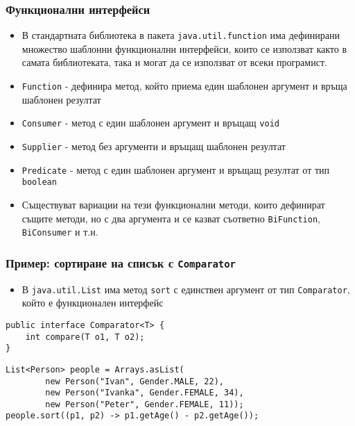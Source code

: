 \documentclass[ignorenonframetext, hyperref=unicode,compress,pdflatex]{beamer}
\begin{document}
\begin{frame}[containsverbatim]\frametitle{Функционални интерфейси}
\begin{itemize}
  \item В стандартната библиотека в пакета \lstinline{java.util.function} има
  дефинирани множество шаблонни функционални интерфейси, които се използват както в самата библиотеката, така
  и могат да се използват от всеки програмист.
  \item \lstinline{Function} - дефинира метод, който приема един шаблонен
  аргумент и връща шаблонен резултат
  \item \lstinline{Consumer} - метод с един шаблонен
  аргумент и връщащ \lstinline{void}
  \item \lstinline{Supplier} - метод без аргументи и връщащ
  шаблонен резултат
  \item \lstinline{Predicate} - метод с един шаблонен
  аргумент и връщащ резултат от тип \lstinline{boolean}
  \item Съществуват вариации на тези функционални методи, които дефинират същите
  методи, но с два аргумента и се казват съответно \lstinline{BiFunction},
  \lstinline{BiConsumer} и т.н.
\end{itemize}
\end{frame}

\begin{frame}[containsverbatim]\frametitle{Пример: сортиране на списък с
\lstinline{Comparator}}
\begin{itemize}
  \item В \lstinline{java.util.List} има метод \lstinline{sort} с единствен
  аргумент от тип \lstinline{Comparator}, който е функционален интерфейс
\end{itemize}
\begin{lstlisting}
public interface Comparator<T> {
	int compare(T o1, T o2);
}
\end{lstlisting}
\begin{lstlisting}
List<Person> people = Arrays.asList(
		new Person("Ivan", Gender.MALE, 22),
		new Person("Ivanka", Gender.FEMALE, 34),
		new Person("Peter", Gender.FEMALE, 11));
people.sort((p1, p2) -> p1.getAge() - p2.getAge());
\end{lstlisting}
\end{frame}
\end{document}
